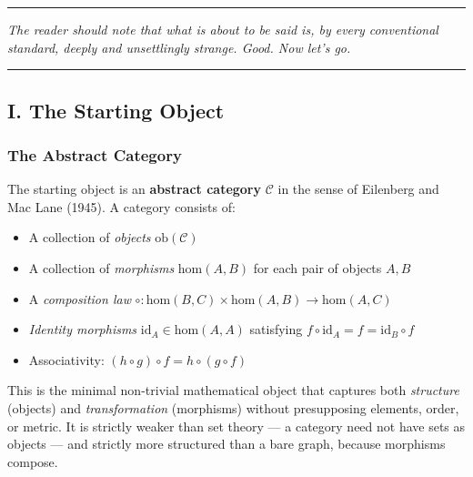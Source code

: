 \documentclass[12pt,a4paper]{article}
\begin{document}
\begin{center}
\rule{0.5\textwidth}{0.4pt}
\end{center}

\begin{center}
\emph{The reader should note that what is about to be said is, by every conventional standard, deeply and unsettlingly strange. Good. Now let's go.}
\end{center}

\begin{center}
\rule{0.5\textwidth}{0.4pt}
\end{center}

\subsection{I. The Starting Object}

\subsubsection{The Abstract Category}

The starting object is an \textbf{abstract category} $\mathcal{C}$ in the sense of Eilenberg and Mac Lane (1945). A category consists of:

\begin{itemize}
    \item A collection of \emph{objects} $\text{ob}(\mathcal{C})$
    \item A collection of \emph{morphisms} $\text{hom}(A, B)$ for each pair of objects $A, B$
    \item A \emph{composition law} $\circ: \text{hom}(B,C) \times \text{hom}(A,B) \to \text{hom}(A,C)$
    \item \emph{Identity morphisms} $\text{id}_A \in \text{hom}(A,A)$ satisfying $f \circ \text{id}_A = f = \text{id}_B \circ f$
    \item Associativity: $(h \circ g) \circ f = h \circ (g \circ f)$
\end{itemize}

This is the minimal non-trivial mathematical object that captures both \emph{structure} (objects) and \emph{transformation} (morphisms) without presupposing elements, order, or metric. It is strictly weaker than set theory --- a category need not have sets as objects --- and strictly more structured than a bare graph, because morphisms compose.
\end{document}
